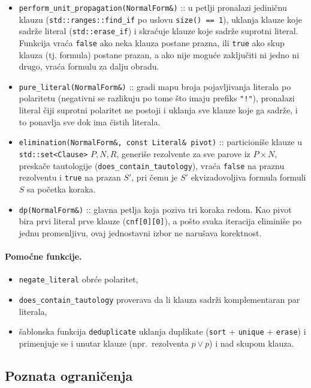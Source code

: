 \documentclass[a4paper,10pt]{article}
\begin{document}
\begin{itemize}
  \item \verb|perform_unit_propagation(NormalForm&)| :: u petlji pronalazi jediničnu klauzu (\verb|std::ranges::find_if| po uslovu \verb|size() == 1|), uklanja klauze koje sadrže literal (\verb|std::erase_if|) i skraćuje klauze koje sadrže suprotni literal. Funkcija vraća \verb|false| ako neka klauza postane prazna, ili \verb|true| ako skup klauza (tj. formula) postane prazan, a ako nije moguće zaključiti ni jedno ni drugo, vraća formulu za dalju obradu.
  \item \verb|pure_literal(NormalForm&)| :: gradi mapu broja pojavljivanja literala po polaritetu (negativni se razlikuju po tome što imaju prefiks \verb|"!"|), pronalazi literal čiji suprotni polaritet ne postoji i uklanja sve klauze koje ga sadrže, i to ponavlja sve dok ima čistih literala.
  \item \verb|elimination(NormalForm&, const Literal& pivot)| :: particioniše klauze u \verb|std::set<Clause>| $P, N, R$, generiše rezolvente za sve parove iz $P \times N$, preskače tautologije (\verb|does_contain_tautology|), vraća \verb|false| na praznu rezolventu i \verb|true| na prazan $S'$, pri čemu je $S'$ ekvizadovoljiva formula formuli $S$ sa početka koraka.
  \item \verb|dp(NormalForm&)| :: glavna petlja koja poziva tri koraka redom. Kao pivot bira prvi literal prve klauze (\verb|cnf[0][0]|), a pošto svaka iteracija eliminiše po jednu promenljivu, ovaj jednostavni izbor ne narušava korektnost.
  
\end{itemize}

\paragraph{Pomoćne funkcije.}
\begin{itemize}
  \item \verb|negate_literal| obrće polaritet,
  \item \verb|does_contain_tautology| proverava da li klauza sadrži komplementaran par literala,
  \item šablonska funkcija \verb|deduplicate| uklanja duplikate (\verb|sort| + \verb|unique| + \verb|erase|) i primenjuje se i unutar klauze (npr.\ rezolventa $p \vee p$) i nad skupom klauza.
\end{itemize}

\subsection{Poznata ograničenja}
\end{document}
